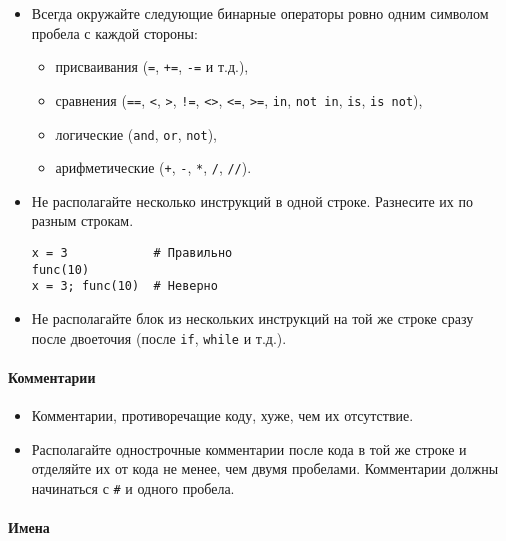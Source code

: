 \documentclass[a4paper, 12pt]{article}
\begin{document}
\begin{itemize}
\item Всегда окружайте следующие бинарные операторы ровно одним символом пробела с каждой стороны:
    \begin{itemize}
    \item присваивания (\lstinline{=}, \lstinline{+=}, \lstinline{-=} и т.д.),
    \item сравнения (\lstinline{==}, \lstinline{<}, \lstinline{>}, \lstinline{!=},
		\lstinline{<>}, \lstinline{<=}, \lstinline{>=}, \lstinline{in}, \lstinline{not in},
		\lstinline{is}, \lstinline{is not}),
    \item логические (\lstinline{and}, \lstinline{or}, \lstinline{not}),
    \item арифметические (\lstinline{+}, \lstinline{-}, \lstinline{*}, \lstinline{/}, \lstinline{//}).
    \end{itemize}

\item Не располагайте несколько инструкций в одной строке. Разнесите их по разным строкам.
    \begin{lstlisting}[texcl]
x = 3            # Правильно
func(10)
x = 3; func(10)  # Неверно 
	\end{lstlisting}
\item Не располагайте блок из нескольких инструкций на той же строке сразу после двоеточия (после \lstinline{if}, \lstinline{while} и т.д.).

\end{itemize}

\paragraph{Комментарии}

\begin{itemize}
\item Комментарии, противоречащие коду, хуже, чем их отсутствие.
\item Располагайте однострочные комментарии после кода в той же строке и отделяйте их от кода не менее, чем двумя пробелами. Комментарии должны начинаться с \lstinline{#} и одного пробела.
\end{itemize}

\paragraph{Имена}
\end{document}
